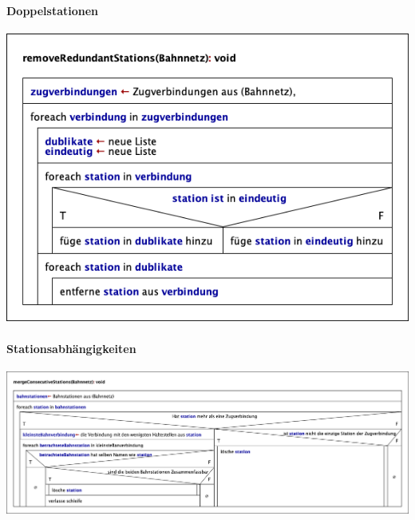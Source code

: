 \paragraph{Doppelstationen}\label{pro:subsubsubsec:doppelstationen}
\begin{center}
    \includegraphics[width=\linewidth]{images/Struktogramme/reducer/reduction1/removeRedundantStations.png}
    \label{pro:subsubsecpar:entfernen-von-doppelstationen}
\end{center}


\paragraph{Stationsabhängigkeiten}\label{pro:subsubsubsec:stationsabhaengigkeiten}
\begin{center}
    \includegraphics[width=\linewidth]{images/Struktogramme/reducer/reduction2/mergeConsecutiveStations.png}
    \label{pro:subsubsecpar:zusammenfassen-von-stationen}
\end{center}

